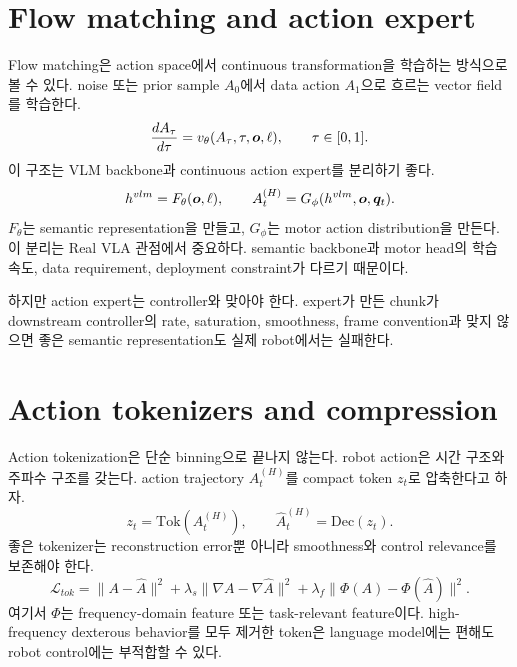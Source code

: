 \section{Flow matching and action expert}

Flow matching은 action space에서 continuous transformation을 학습하는 방식으로 볼 수 있다. noise 또는 prior sample $A_0$에서 data action $A_1$으로 흐르는 vector field를 학습한다.
\begin{equation}
  \frac{dA_{\tau}}{d\tau}
  =
  v_{\theta}(A_{\tau},\tau,\bm{o},\ell),
  \qquad
  \tau\in[0,1].
  \label{eq:ch13-flow-matching}
\end{equation}
이 구조는 VLM backbone과 continuous action expert를 분리하기 좋다.
\begin{equation}
  h^{vlm}
  =
  F_{\theta}(\bm{o},\ell),
  \qquad
  A_t^{(H)}
  =
  G_{\phi}(h^{vlm},\bm{o},\bm{q}_t).
  \label{eq:ch13-action-expert}
\end{equation}
$F_{\theta}$는 semantic representation을 만들고, $G_{\phi}$는 motor action distribution을 만든다. 이 분리는 Real VLA 관점에서 중요하다. semantic backbone과 motor head의 학습 속도, data requirement, deployment constraint가 다르기 때문이다.

하지만 action expert는 controller와 맞아야 한다. expert가 만든 chunk가 downstream controller의 rate, saturation, smoothness, frame convention과 맞지 않으면 좋은 semantic representation도 실제 robot에서는 실패한다.

\section{Action tokenizers and compression}

Action tokenization은 단순 binning으로 끝나지 않는다. robot action은 시간 구조와 주파수 구조를 갖는다. action trajectory $A_t^{(H)}$를 compact token $z_t$로 압축한다고 하자.
\begin{equation}
  z_t
  =
  \mathrm{Tok}(A_t^{(H)}),
  \qquad
  \hat{A}_t^{(H)}
  =
  \mathrm{Dec}(z_t).
  \label{eq:ch13-chunk-tokenization}
\end{equation}
좋은 tokenizer는 reconstruction error뿐 아니라 smoothness와 control relevance를 보존해야 한다.
\begin{equation}
  \mathcal{L}_{tok}
  =
  \|A-\hat{A}\|^2
  +
  \lambda_s
  \|\nabla A-\nabla \hat{A}\|^2
  +
  \lambda_f
  \|\Phi(A)-\Phi(\hat{A})\|^2.
  \label{eq:ch13-tokenizer-loss}
\end{equation}
여기서 $\Phi$는 frequency-domain feature 또는 task-relevant feature이다. high-frequency dexterous behavior를 모두 제거한 token은 language model에는 편해도 robot control에는 부적합할 수 있다.

